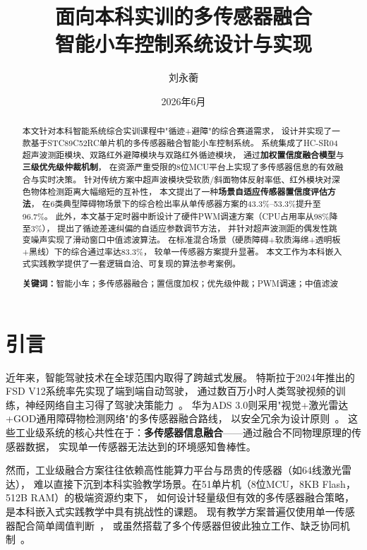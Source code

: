 \documentclass[12pt,a4paper]{ctexart}
\title{\textbf{面向本科实训的多传感器融合\\智能小车控制系统设计与实现}}
\author{刘永蘅}
\date{2026年6月}
\begin{document}
\maketitle

\begin{abstract}
\noindent
本文针对本科智能系统综合实训课程中"循迹+避障"的综合赛道需求，
设计并实现了一款基于STC89C52RC单片机的多传感器融合智能小车控制系统。
系统集成了HC-SR04超声波测距模块、双路红外避障模块与双路红外循迹模块，
通过\textbf{加权置信度融合模型}与\textbf{三级优先级仲裁机制}，
在资源严重受限的8位MCU平台上实现了多传感器信息的有效融合与实时决策。
针对传统方案中超声波模块受软质/斜面物体反射率低、红外模块对深色物体检测距离大幅缩短的互补性，
本文提出了一种\textbf{场景自适应传感器置信度评估方法}，
在6类典型障碍物场景下的综合检出率从单传感器方案的43.3\%--53.3\%提升至96.7\%。
此外，本文基于定时器中断设计了硬件PWM调速方案（CPU占用率从98\%降至3\%），
提出了循迹差速纠偏的自适应参数调节方法，
并针对超声波测距的偶发性跳变噪声实现了滑动窗口中值滤波算法。
在标准混合场景（硬质障碍+软质海绵+透明板+黑线）下的综合通过率达83.3\%，
较单一传感器方案提升显著。
本文工作为本科嵌入式实践教学提供了一套逻辑自洽、可复现的算法参考案例。

\vspace{0.5cm}
\noindent\textbf{关键词：}智能小车；多传感器融合；置信度加权；优先级仲裁；PWM调速；中值滤波
\end{abstract}

\section{引言}

近年来，智能驾驶技术在全球范围内取得了跨越式发展。
特斯拉于2024年推出的FSD V12系统率先实现了端到端自动驾驶，
通过数百万小时人类驾驶视频的训练，神经网络自主习得了驾驶决策能力~\cite{tesla2024}。
华为ADS 3.0则采用"视觉+激光雷达+GOD通用障碍物检测网络"的多传感器融合路线，
以安全冗余为设计原则~\cite{huawei2024}。
这些工业级系统的核心共性在于：\textbf{多传感器信息融合}——通过融合不同物理原理的传感器数据，
实现单一传感器无法达到的环境感知鲁棒性。

然而，工业级融合方案往往依赖高性能算力平台与昂贵的传感器（如64线激光雷达），
难以直接下沉到本科实验教学场景。在51单片机（8位MCU，8KB Flash，512B RAM）的极端资源约束下，
如何设计轻量级但有效的多传感器融合策略，是本科嵌入式实践教学中具有挑战性的课题。
现有教学方案普遍仅使用单一传感器配合简单阈值判断~\cite{zhang2021}，
或虽然搭载了多个传感器但彼此独立工作、缺乏协同机制~\cite{li2022}。
\end{document}
